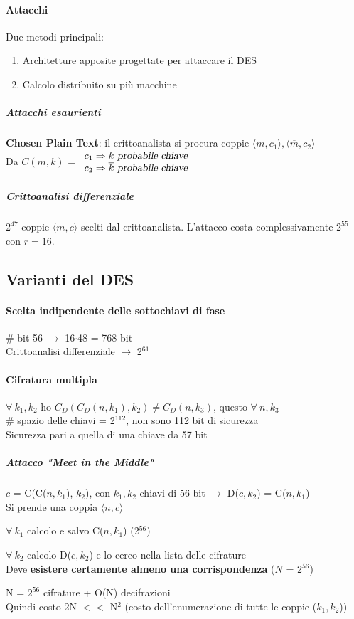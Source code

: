\documentclass[10pt]{book}
\begin{document}
\paragraph{Attacchi} Due metodi principali:
\begin{enumerate}
	\item Architetture apposite progettate per attaccare il DES
	\item Calcolo distribuito su più macchine
\end{enumerate}
\subparagraph{Attacchi esaurienti}
\textbf{Chosen Plain Text}: il crittoanalista si procura coppie $\langle m, c_1\rangle, \langle \overline{m}, c_2\rangle$\\
Da $C(m, k)$ = $\begin{array}{l}
	c_1 \Rightarrow k \textsl{ probabile chiave}\\
	c_2 \Rightarrow \overline{k} \textsl{ probabile chiave}
\end{array}$
\subparagraph{Crittoanalisi differenziale} $2^{47}$ coppie $\langle m,c\rangle$ scelti dal crittoanalista. L'attacco costa complessivamente $2^{55}$ con $r=16$.
\subsection{Varianti del DES}
\paragraph{Scelta indipendente delle sottochiavi di fase} \# bit 56 $\rightarrow$ 16$\cdot$48 = 768 bit\\
Crittoanalisi differenziale $\rightarrow$ 2$^{61}$
\paragraph{Cifratura multipla} $\forall\:k_1,k_2$ ho $C_D(C_D(n, k_1), k_2) \neq C_D(n, k_3)$, questo $\forall\:n, k_3$\\
\# spazio delle chiavi = 2$^{112}$, non sono 112 bit di sicurezza\\ %
Sicurezza pari a quella di una chiave da 57 bit
\subparagraph{Attacco "Meet in the Middle"} $c$ = C(C($n, k_1$), $k_2$), con $k_1,k_2$ chiavi di 56 bit $\rightarrow$ D($c, k_2$) = C($n, k_1$)\\
Si prende una coppia $\langle n,c\rangle$
\begin{list}{}{}
	\item $\forall\:k_1$ calcolo e salvo C($n, k_1$) (2$^{56}$)
	\item $\forall\:k_2$ calcolo D($c, k_2$) e lo cerco nella lista delle cifrature\\
	Deve \textbf{esistere certamente almeno una corrispondenza} ($N$ = 2$^{56}$)
	\item N = $2^{56}$ cifrature + O(N) decifrazioni\\
	Quindi costo 2N $<<$ N$^2$ (costo dell'enumerazione di tutte le coppie ($k_1, k_2$))
\end{list}
\end{document}
